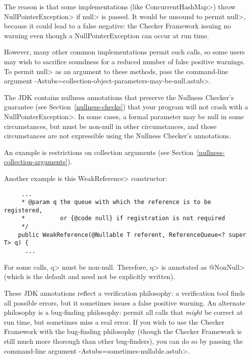 The reason is that some implementations (like \<ConcurrentHashMap>) throw
\<NullPointerException> if \<null> is passed.  It would be unsound to
permit \<null>, because it could lead to a false negative:  the Checker
Framework issuing no warning even though a NullPointerException can occur
at run time.

However, many other common implementations permit such calls, so some users
may wish to sacrifice soundness for a reduced number of false positive
warnings.  To permit \<null> as an argument to these methods, pass the
command-line argument
\<-Astubs=collection-object-parameters-may-be-null.astub>.



The JDK contains nullness annotations that preserve the Nullness Checker's
guarantee (see Section~\ref{nullness-checks}) that your program will not
crash with a \<NullPointerException>.  In some cases, a formal parameter
may be null in some circumstances, but must be non-null in other
circumstances, and those circumstances are not expressible using the
Nullness Checker's annotations.

An example is restrictions on collection arguments (see
Section~\ref{nullness-collection-arguments}).

Another example is this \<WeakReference> constructor:

\begin{Verbatim}
     ...
     * @param q the queue with which the reference is to be registered,
     *          or {@code null} if registration is not required
     */
    public WeakReference(@Nullable T referent, ReferenceQueue<? super T> q) {
      ...
\end{Verbatim}

For some calls, \<q> must be non-null.  Therefore, \<q> is annotated as
\<@NonNull> (which is the default and need not be explicitly written).

These JDK annotations reflect a verification philosophy:  a verification
tool finds all possible errors, but it sometimes issues a false positive warning.
An alternate philosophy is a bug-finding philosophy:  permit all calls that
\emph{might} be correct at run time, but sometimes miss a real error.  If
you wish to use the Checker Framework with the bug-finding philosophy
(though the Checker Framework is still much more thorough than other
bug-finders), you can do so by passing the command-line argument
\<-Astubs=sometimes-nullable.astub>.


